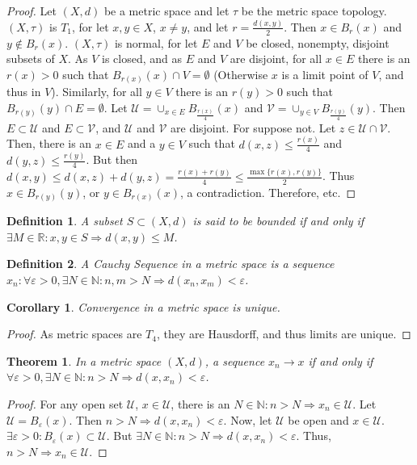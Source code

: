 \documentclass[crop=false,class=book]{standalone}
\theoremstyle{mystyle}
\newtheorem{theorem}{Theorem}[section]
\newtheorem{definition}{Definition}[section]
\newtheorem{corollary}{Corollary}[section]
\begin{document}
\begin{proof}
Let $(X,d)$ be a metric space and let $\tau$ be the metric space topology. $(X,\tau)$ is $T_1$, for let $x,y\in X$, $x\ne y$, and let $r= \frac{d(x,y)}{2}$. Then $x\in B_{r}(x)$ and $y\notin B_{r}(x)$. $(X,\tau)$ is normal, for let $E$ and $V$ be closed, nonempty, disjoint subsets of $X$. As $V$ is closed, and as $E$ and $V$ are disjoint, for all $x\in E$ there is an $r(x)>0$ such that $B_{r(x)}(x)\cap V = \emptyset$ (Otherwise $x$ is a limit point of $V$, and thus in $V$). Similarly, for all $y\in V$ there is an $r(y)>0$ such that $B_{r(y)}(y)\cap E = \emptyset$. Let $\mathcal{U} = \cup_{x\in E}B_{\frac{r(x)}{4}}(x)$ and $\mathcal{V} = \cup_{y\in V}B_{\frac{r(y)}{4}}(y)$. Then $E\subset \mathcal{U}$ and $E\subset \mathcal{V}$, and $\mathcal{U}$ and $\mathcal{V}$ are disjoint. For suppose not. Let $z\in \mathcal{U}\cap \mathcal{V}$. Then, there is an $x\in E$ and a $y\in V$ such that $d(x,z)\leq \frac{r(x)}{4}$ and $d(y,z)\leq \frac{r(y)}{4}$. But then $d(x,y) \leq d(x,z)+d(y,z) = \frac{r(x)+r(y)}{4} \leq \frac{\max\{r(x),r(y)\}}{2}$. Thus $x\in B_{r(y)}(y)$, or $y\in B_{r(x)}(x)$, a contradiction. Therefore, etc.
\end{proof}
\begin{definition}
A subset $S\subset (X,d)$ is said to be bounded if and only if $\exists M\in \mathbb{R}:x,y\in S\Rightarrow d(x,y)\leq M$.
\end{definition}
\begin{definition}
A Cauchy Sequence in a metric space is a sequence $x_n:\forall \varepsilon>0,\exists N\in \mathbb{N}:n,m>N\Rightarrow d(x_n,x_m)<\varepsilon$.
\end{definition}
\begin{corollary}
Convergence in a metric space is unique.
\end{corollary}
\begin{proof}
As metric spaces are $T_4$, they are Hausdorff, and thus limits are unique.
\end{proof}
\begin{theorem}
In a metric space $(X,d)$, a sequence $x_n\rightarrow x$ if and only if $\forall\varepsilon>0,\exists N\in \mathbb{N}:n>N\Rightarrow d(x,x_n)<\varepsilon$.
\end{theorem}
\begin{proof}
For any open set $\mathcal{U}$, $x\in \mathcal{U}$, there is an $N\in \mathbb{N}:n>N\Rightarrow x_n \in \mathcal{U}$. Let $\mathcal{U}=B_{\varepsilon}(x)$. Then $n>N\Rightarrow d(x,x_n)<\varepsilon$. Now, let $\mathcal{U}$ be open and $x\in \mathcal{U}$. $\exists\varepsilon>0:B_{\varepsilon}(x)\subset \mathcal{U}$. But $\exists N\in \mathbb{N}:n>N\Rightarrow d(x,x_n)<\varepsilon$. Thus, $n>N\Rightarrow x_n\in \mathcal{U}$.
\end{proof}
\end{document}
